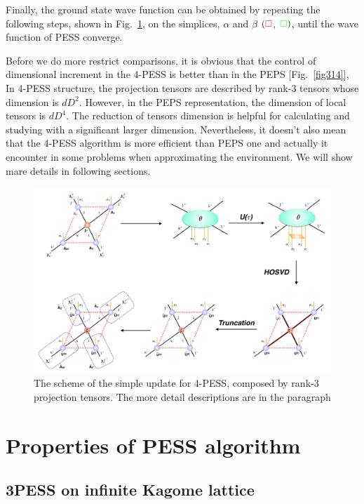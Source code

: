 Finally, the ground state wave function can be obtained by repeating the following steps, shown in Fig.~\ref{fig4326}, on the simplices, $\alpha$ and $\beta$ $( \color{red} \square$, ${\color{green} \square})$, until the wave function of PESS converge.

Before we do more restrict comparisons, it is obvious that the control of dimensional increment in the 4-PESS is better than in the PEPS [Fig.~\ref{fig314}], In 4-PESS structure, the projection tensors are described by rank-3 tensors whose dimension is $dD^2$. However, in the PEPS representation, the dimension of local tensors is $dD^4$. The reduction of tensors dimension is helpful for calculating and studying with a significant larger dimension. Nevertheless, it doesn't also mean that the 4-PESS algorithm is more efficient than PEPS one and actually it encounter in some problems when approximating the environment. We will show mare details in following sections.

\begin{figure}[ht]
	\centering
	\includegraphics[width=1.00\textwidth]{figures/fig4326.png}
	\caption[The scheme of the simple update for 4-PESS, composed by rank-3 projection tensors.]{The scheme of the simple update for 4-PESS, composed by rank-3 projection tensors. The more detail descriptions are in the paragraph}
	\label{fig4326}
\end{figure}

\section{Properties of PESS algorithm}

\subsection{3PESS on infinite Kagome lattice}

